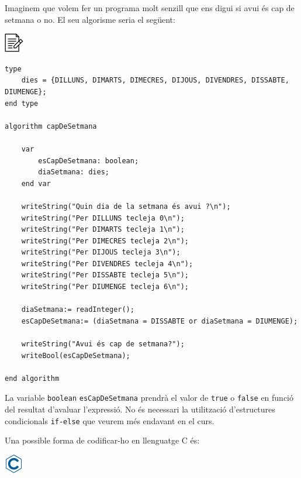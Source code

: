 \documentclass[]{book}
\begin{document}
Imaginem que volem fer un programa molt senzill que ens digui si avui és cap de setmana o no. El seu algorisme seria el següent:

\includegraphics{./img/alg.png}

\begin{verbatim}
type
    dies = {DILLUNS, DIMARTS, DIMECRES, DIJOUS, DIVENDRES, DISSABTE, DIUMENGE};
end type

algorithm capDeSetmana

    var
        esCapDeSetmana: boolean;
        diaSetmana: dies;
    end var

    writeString("Quin dia de la setmana és avui ?\n");
    writeString("Per DILLUNS tecleja 0\n");
    writeString("Per DIMARTS tecleja 1\n");
    writeString("Per DIMECRES tecleja 2\n");
    writeString("Per DIJOUS tecleja 3\n");
    writeString("Per DIVENDRES tecleja 4\n");
    writeString("Per DISSABTE tecleja 5\n");
    writeString("Per DIUMENGE tecleja 6\n");
 
    diaSetmana:= readInteger();
    esCapDeSetmana:= (diaSetmana = DISSABTE or diaSetmana = DIUMENGE);

    writeString("Avui és cap de setmana?");
    writeBool(esCapDeSetmana);

end algorithm
\end{verbatim}

La variable \texttt{boolean} \texttt{esCapDeSetmana} prendrà el valor de \texttt{true} o \texttt{false} en funció del resultat d'avaluar l'expressió. No és necessari la utilització d'estructures condicionals \texttt{if-else} que veurem més endavant en el curs.

Una possible forma de codificar-ho en llenguatge C és:

\includegraphics{./img/c.png}
\end{document}
